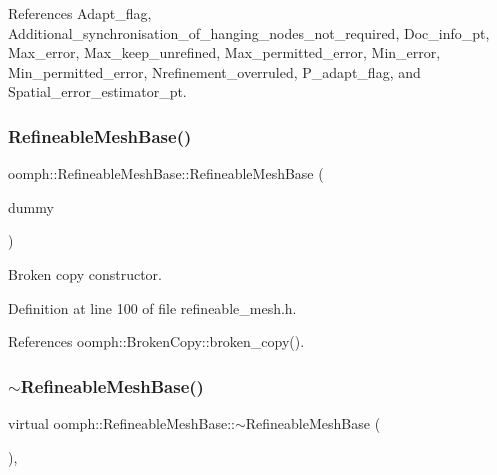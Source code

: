 References Adapt\+\_\+flag, Additional\+\_\+synchronisation\+\_\+of\+\_\+hanging\+\_\+nodes\+\_\+not\+\_\+required, Doc\+\_\+info\+\_\+pt, Max\+\_\+error, Max\+\_\+keep\+\_\+unrefined, Max\+\_\+permitted\+\_\+error, Min\+\_\+error, Min\+\_\+permitted\+\_\+error, Nrefinement\+\_\+overruled, P\+\_\+adapt\+\_\+flag, and Spatial\+\_\+error\+\_\+estimator\+\_\+pt.

\mbox{\label{classoomph_1_1RefineableMeshBase_a4de75dc90274e3ebd889b9ae680ef1a5}} 
\subsubsection{\texorpdfstring{Refineable\+Mesh\+Base()}{RefineableMeshBase()}\hspace{0.1cm}{\footnotesize\ttfamily [2/2]}}
{\footnotesize\ttfamily oomph\+::\+Refineable\+Mesh\+Base\+::\+Refineable\+Mesh\+Base (\begin{DoxyParamCaption}\item[{const \hyperlink{classoomph_1_1RefineableMeshBase}{Refineable\+Mesh\+Base} \&}]{dummy }\end{DoxyParamCaption})\hspace{0.3cm}{\ttfamily [inline]}}



Broken copy constructor. 



Definition at line 100 of file refineable\+\_\+mesh.\+h.



References oomph\+::\+Broken\+Copy\+::broken\+\_\+copy().

\mbox{\label{classoomph_1_1RefineableMeshBase_ace69036132a97dd34dc9969a0db5b502}} 
\subsubsection{\texorpdfstring{$\sim$\+Refineable\+Mesh\+Base()}{~RefineableMeshBase()}}
{\footnotesize\ttfamily virtual oomph\+::\+Refineable\+Mesh\+Base\+::$\sim$\+Refineable\+Mesh\+Base (\begin{DoxyParamCaption}{ }\end{DoxyParamCaption})\hspace{0.3cm}{\ttfamily [inline]}, {\ttfamily [virtual]}}



